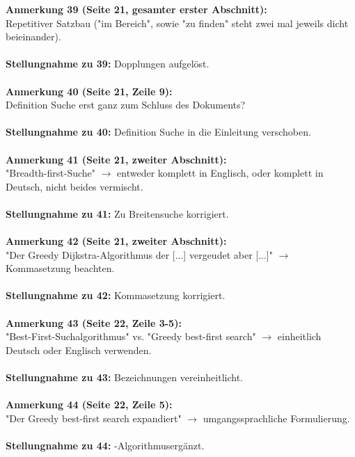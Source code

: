 \documentclass[a4paper,12pt]{book}
\begin{document}
\noindent
\textbf{Anmerkung 39 (Seite 21, gesamter erster Abschnitt):}\\
Repetitiver Satzbau ("im Bereich", sowie "zu finden" steht zwei mal jeweils dicht beieinander). \\
\\
\textbf{Stellungnahme zu 39:}
Dopplungen aufgelöst.
\\ \\
\noindent
\textbf{Anmerkung 40 (Seite 21, Zeile 9):}\\
Definition \glqq Suche \grqq erst ganz zum Schluss des Dokuments? 
\\ \\
\textbf{Stellungnahme zu 40:}
Definition \glqq Suche \grqq in die Einleitung verschoben.
\\ \\
\noindent
\textbf{Anmerkung 41 (Seite 21, zweiter Abschnitt):}\\
"Breadth-first-Suche" $\rightarrow$ entweder komplett in Englisch, oder komplett in Deutsch, nicht beides vermischt. \\
\\
\textbf{Stellungnahme zu 41:}
Zu \glqq Breitensuche \grqq korrigiert.
\\ \\
\noindent
\textbf{Anmerkung 42 (Seite 21, zweiter Abschnitt):}\\
"Der Greedy Dijkstra-Algorithmus der [...] vergeudet aber [...]" $\rightarrow$ Kommasetzung beachten. \\
\\
\textbf{Stellungnahme zu 42:}
Kommasetzung korrigiert.
\\ \\
\noindent
\textbf{Anmerkung 43 (Seite 22, Zeile 3-5):}\\
"Best-First-Suchalgorithmus" vs. "Greedy best-first search" $\rightarrow$ einheitlich Deutsch oder Englisch verwenden. \\
\\
\textbf{Stellungnahme zu 43:}
Bezeichnungen vereinheitlicht.
\\ \\
\noindent
\textbf{Anmerkung 44 (Seite 22, Zeile 5):}\\
"Der Greedy best-first search expandiert" $\rightarrow$ umgangssprachliche Formulierung. \\
\\
\textbf{Stellungnahme zu 44:}
\glqq-Algorithmus\grqq ergänzt.
\\ \\
\end{document}

